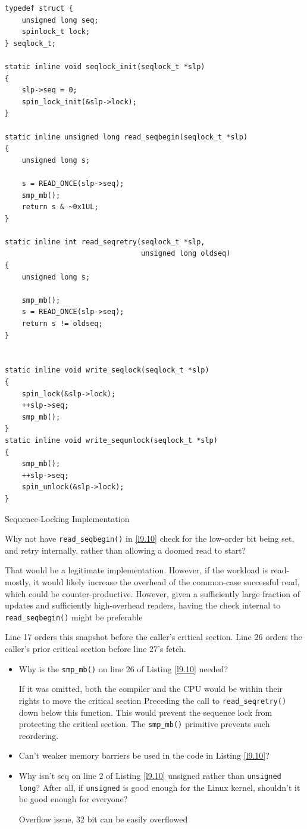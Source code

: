 \documentclass[11pt]{article}
\begin{document}
\begin{listing}[htbp]
\begin{verbatim}
typedef struct {
    unsigned long seq;
    spinlock_t lock;
} seqlock_t;

static inline void seqlock_init(seqlock_t *slp)
{
    slp->seq = 0;
    spin_lock_init(&slp->lock);
}

static inline unsigned long read_seqbegin(seqlock_t *slp)
{
    unsigned long s;

    s = READ_ONCE(slp->seq);
    smp_mb();
    return s & ~0x1UL;
}

static inline int read_seqretry(seqlock_t *slp,
                                unsigned long oldseq)
{
    unsigned long s;

    smp_mb();
    s = READ_ONCE(slp->seq);
    return s != oldseq;
}


static inline void write_seqlock(seqlock_t *slp)
{
    spin_lock(&slp->lock);
    ++slp->seq;
    smp_mb();
}
static inline void write_sequnlock(seqlock_t *slp)
{
    smp_mb();
    ++slp->seq;
    spin_unlock(&slp->lock);
}
\end{verbatim}
\caption{\label{l9.10}Sequence-Locking Implementation}
\end{listing}

\begin{remark}[]
Why not have \texttt{read\_seqbegin()} in \ref{l9.10} check for the low-order bit being set, and retry internally,
rather than allowing a doomed read to start?

That would be a legitimate implementation. However, if the workload is read-mostly, it would likely
increase the overhead of the common-case successful read, which could be counter-productive. However,
given a sufficiently large fraction of updates and sufficiently high-overhead readers, having the
check internal to \texttt{read\_seqbegin()} might be preferable
\end{remark}

Line 17 orders this snapshot before the caller's critical section. Line 26 orders the caller's prior
critical section before line 27's fetch.
\begin{remark}[]
\begin{itemize}
\item Why is the \texttt{smp\_mb()} on line 26 of Listing \ref{l9.10} needed?

If it was omitted, both the compiler and the CPU would be within their rights to move the critical
section Preceding the call to \texttt{read\_seqretry()} down below this function. This would prevent the
sequence lock from protecting the critical section. The \texttt{smp\_mb()} primitive prevents such reordering.
\item Can’t weaker memory barriers be used in the code in Listing \ref{l9.10}?
\item Why isn’t seq on line 2 of Listing \ref{l9.10} unsigned rather than \texttt{unsigned long}? After all, if
\texttt{unsigned} is good enough for the Linux kernel, shouldn’t it be good enough for everyone?

Overflow issue, 32 bit can be easily overflowed
\end{itemize}
\end{remark}
\end{document}
